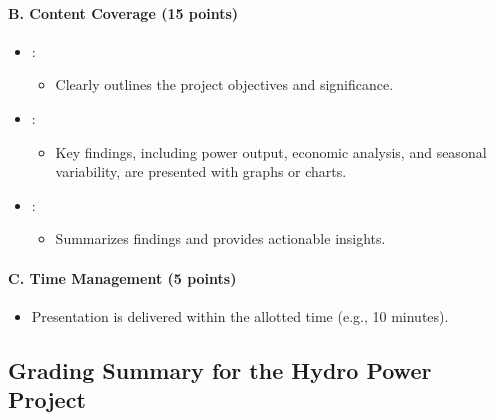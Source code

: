 \documentclass[letterpaper,10pt,english]{jupyterBook}
\begin{document}
\paragraph{B. Content Coverage (15 points)}
\label{\detokenize{ProjectInstructions:id26}}\begin{itemize}
\item {} 
\sphinxAtStartPar
{}:
\begin{itemize}
\item {} 
\sphinxAtStartPar
Clearly outlines the project objectives and significance.

\end{itemize}

\item {} 
\sphinxAtStartPar
{}:
\begin{itemize}
\item {} 
\sphinxAtStartPar
Key findings, including power output, economic analysis, and
seasonal variability, are presented with graphs or charts.

\end{itemize}

\item {} 
\sphinxAtStartPar
{}:
\begin{itemize}
\item {} 
\sphinxAtStartPar
Summarizes findings and provides actionable insights.

\end{itemize}

\end{itemize}


\paragraph{C. Time Management (5 points)}
\label{\detokenize{ProjectInstructions:id27}}\begin{itemize}
\item {} 
\sphinxAtStartPar
Presentation is delivered within the allotted time (e.g., 10
minutes).

\end{itemize}


\subsection{Grading Summary for the Hydro Power Project}
\label{\detokenize{ProjectInstructions:grading-summary-for-the-hydro-power-project}}
\end{document}
